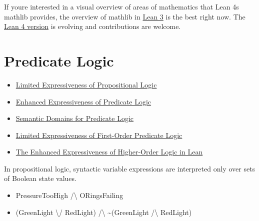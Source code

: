 \documentclass{book}
\providecommand{\tightlist}{%
  \setlength{\itemsep}{0pt}\setlength{\parskip}{0pt}}
\begin{document}
If you\textquotesingle re interested in a visual overview of areas of mathematics that Lean 4\textquotesingle s mathlib provides, the overview of mathlib in \href{https://leanprover-community.github.io/mathlib-overview.html}{Lean 3} is the best right now. The \href{https://leanprover-community.github.io/theories.html\#lean-mathematical-theories}{Lean 4 version} is evolving and contributions are welcome.

\hypertarget{pandoc.profile.debug__pandoc__debug__src__predlogic.md}{}
\hypertarget{pandoc.profile.debug__pandoc__debug__src__predlogic.md__predicate-logic}{%
\chapter{Predicate Logic}\label{pandoc.profile.debug__pandoc__debug__src__predlogic.md__predicate-logic}}

\begin{itemize}
\tightlist
\item
  \protect\hyperlink{pandoc.profile.debug__pandoc__debug__src__predlogic.md__limited-expressiveness-of-propositional-logic}{Limited Expressiveness of Propositional Logic}
\item
  \protect\hyperlink{pandoc.profile.debug__pandoc__debug__src__predlogic.md__enhanced-expressiveness-of-predicate-logic}{Enhanced Expressiveness of Predicate Logic}
\item
  \protect\hyperlink{pandoc.profile.debug__pandoc__debug__src__predlogic.md__semantic-domains-for-predicate-logic}{Semantic Domains for Predicate Logic}
\item
  \protect\hyperlink{pandoc.profile.debug__pandoc__debug__src__predlogic.md__limited-expressiveness-of-first-order-predicate-logic}{Limited Expressiveness of First-Order Predicate Logic}
\item
  \protect\hyperlink{pandoc.profile.debug__pandoc__debug__src__predlogic.md__the-enhanced-expressiveness-of-higher-order-logic-in-lean}{The Enhanced Expressiveness of Higher-Order Logic in Lean}
\end{itemize}

In propositional logic, syntactic variable expressions
are interpreted only over sets of Boolean state values.

\begin{itemize}
\tightlist
\item
  PressureTooHigh /\textbackslash{} ORingsFailing
\item
  (GreenLight \textbackslash/ RedLight) /\textbackslash{} \textasciitilde(GreenLight /\textbackslash{} RedLight)
\end{itemize}
\end{document}
